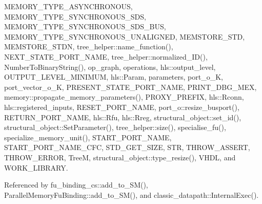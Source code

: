 M\+E\+M\+O\+R\+Y\+\_\+\+T\+Y\+P\+E\+\_\+\+A\+S\+Y\+N\+C\+H\+R\+O\+N\+O\+US, M\+E\+M\+O\+R\+Y\+\_\+\+T\+Y\+P\+E\+\_\+\+S\+Y\+N\+C\+H\+R\+O\+N\+O\+U\+S\+\_\+\+S\+DS, M\+E\+M\+O\+R\+Y\+\_\+\+T\+Y\+P\+E\+\_\+\+S\+Y\+N\+C\+H\+R\+O\+N\+O\+U\+S\+\_\+\+S\+D\+S\+\_\+\+B\+US, M\+E\+M\+O\+R\+Y\+\_\+\+T\+Y\+P\+E\+\_\+\+S\+Y\+N\+C\+H\+R\+O\+N\+O\+U\+S\+\_\+\+U\+N\+A\+L\+I\+G\+N\+ED, M\+E\+M\+S\+T\+O\+R\+E\+\_\+\+S\+TD, M\+E\+M\+S\+T\+O\+R\+E\+\_\+\+S\+T\+DN, tree\+\_\+helper\+::name\+\_\+function(), N\+E\+X\+T\+\_\+\+S\+T\+A\+T\+E\+\_\+\+P\+O\+R\+T\+\_\+\+N\+A\+ME, tree\+\_\+helper\+::normalized\+\_\+\+I\+D(), Number\+To\+Binary\+String(), op\+\_\+graph, operations, hls\+::output\+\_\+level, O\+U\+T\+P\+U\+T\+\_\+\+L\+E\+V\+E\+L\+\_\+\+M\+I\+N\+I\+M\+UM, hls\+::\+Param, parameters, port\+\_\+o\+\_\+K, port\+\_\+vector\+\_\+o\+\_\+K, P\+R\+E\+S\+E\+N\+T\+\_\+\+S\+T\+A\+T\+E\+\_\+\+P\+O\+R\+T\+\_\+\+N\+A\+ME, P\+R\+I\+N\+T\+\_\+\+D\+B\+G\+\_\+\+M\+EX, memory\+::propagate\+\_\+memory\+\_\+parameters(), P\+R\+O\+X\+Y\+\_\+\+P\+R\+E\+F\+IX, hls\+::\+Rconn, hls\+::registered\+\_\+inputs, R\+E\+S\+E\+T\+\_\+\+P\+O\+R\+T\+\_\+\+N\+A\+ME, port\+\_\+o\+::resize\+\_\+busport(), R\+E\+T\+U\+R\+N\+\_\+\+P\+O\+R\+T\+\_\+\+N\+A\+ME, hls\+::\+Rfu, hls\+::\+Rreg, structural\+\_\+object\+::set\+\_\+id(), structural\+\_\+object\+::\+Set\+Parameter(), tree\+\_\+helper\+::size(), specialise\+\_\+fu(), specialize\+\_\+memory\+\_\+unit(), S\+T\+A\+R\+T\+\_\+\+P\+O\+R\+T\+\_\+\+N\+A\+ME, S\+T\+A\+R\+T\+\_\+\+P\+O\+R\+T\+\_\+\+N\+A\+M\+E\+\_\+\+C\+FC, S\+T\+D\+\_\+\+G\+E\+T\+\_\+\+S\+I\+ZE, S\+TR, T\+H\+R\+O\+W\+\_\+\+A\+S\+S\+E\+RT, T\+H\+R\+O\+W\+\_\+\+E\+R\+R\+OR, TreeM, structural\+\_\+object\+::type\+\_\+resize(), V\+H\+DL, and W\+O\+R\+K\+\_\+\+L\+I\+B\+R\+A\+RY.



Referenced by fu\+\_\+binding\+\_\+cs\+::add\+\_\+to\+\_\+\+S\+M(), Parallel\+Memory\+Fu\+Binding\+::add\+\_\+to\+\_\+\+S\+M(), and classic\+\_\+datapath\+::\+Internal\+Exec().

